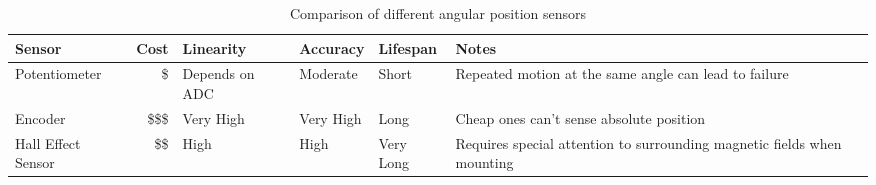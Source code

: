 \begin{table}[H]
	\begin{center}
		\begin{tabular}{ | p{2.4cm} | r | p{1.6cm} | l | l | p{2.5cm} |}
			\hline
			Sensor & Cost & Linearity & Accuracy & Lifespan & Notes
			\\ \hline
			Potentiometer & \$ & Depends on ADC & Moderate & Short & Repeated motion at the same angle can lead to failure
			\\ \hline
			Encoder & \$\$\$ & Very High & Very High & Long & Cheap ones can't sense absolute position
			\\ \hline
			Hall Effect Sensor & \$\$ & High & High & Very Long & Requires special attention to surrounding magnetic fields when mounting
			\\ \hline
		\end{tabular}
	\end{center}
	\caption{Comparison of different angular position sensors}
	\label{tbl:Angular_pos_sensors}
\end{table}

